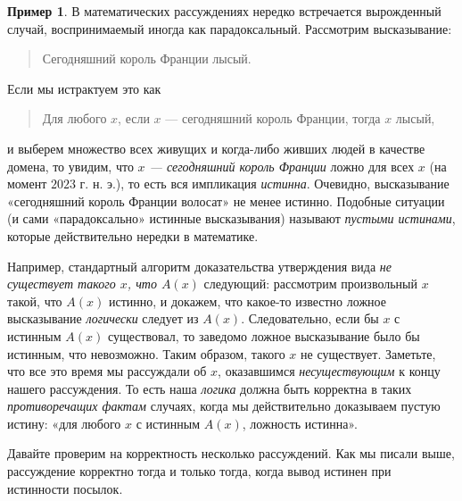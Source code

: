\documentclass[12pt,notitlepage]{article}
\theoremstyle{plain}
\theoremstyle{definition}
\newtheorem{exm}[thm]{Пример}
\theoremstyle{plain}
\newcommand{\1}{\mathbf{1}}
\newcommand{\0}{\mathbf{0}}
\newcommand{\mcomm}[1]{}
\begin{document}
\begin{exm}\label{exm_vacuous}
	В математических рассуждениях нередко встречается вырожденный случай, воспринимаемый иногда как парадоксальный. Рассмотрим высказывание:
	\begin{quote}
		Сегодняшний король Франции лысый.
	\end{quote}
	Если мы истрактуем это как 
	\begin{quote}
		Для любого $x$, если $x$ --- сегодняшний король Франции, тогда $x$ лысый,
	\end{quote}
	и выберем множество всех живущих и когда-либо живших людей в качестве домена, то увидим, что \emph{$x$ --- сегодняшний король Франции} ложно для всех $x$ (на момент $2023$ г. н. э.), то есть вся импликация \emph{истинна}. Очевидно, высказывание «сегодняшний король Франции волосат» не менее истинно. Подобные ситуации (и сами «парадоксально» истинные высказывания) называют \emph{пустыми истинами}, которые действительно нередки в математике.
	
	Например, стандартный алгоритм доказательства утверждения вида \emph{не существует такого $x$, что $A(x)$} следующий: рассмотрим произвольный $x$ такой, что $A(x)$ истинно, и докажем, что какое-то известно ложное высказывание \emph{логически} следует из $A(x)$. Следовательно, если бы $x$ с истинным $A(x)$ существовал, то заведомо ложное высказывание было бы истинным, что невозможно. Таким образом, такого $x$ не существует. Заметьте, что все это время мы рассуждали об $x$, оказавшимся \emph{несуществующим} к концу нашего рассуждения. То есть наша \emph{логика} должна быть корректна в таких \emph{противоречащих фактам} случаях, когда мы действительно доказываем пустую истину: «для любого $x$ с истинным $A(x)$, ложность истинна». 
\end{exm}
\mcomm{}

Давайте проверим на корректность несколько рассуждений. Как мы писали выше, рассуждение корректно тогда и только тогда, когда вывод истинен при истинности посылок.
\end{document}
